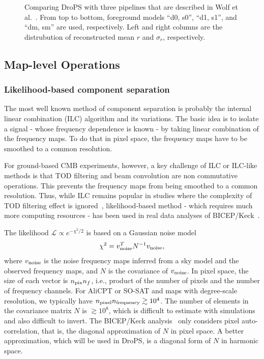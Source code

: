 \documentclass[12pt, a4paper]{ctexart} %
\begin{document}
\begin{figure}
  \caption{Comparing DroPS with three pipelines that are described in Wolf et al.~\cite{SO-SAT}. From top to bottom, foreground models ``d0, s0'', ``d1, s1'', and ``dm, sm'' are used, respectively. Left and right columns are the distrubution of reconstructed mean $r$ and $\sigma_r$, respectively.\label{fig:compare_SO}}
\end{figure}

\subsection{Map-level Operations}

\subsubsection{Likelihood-based component separation}
The most well known method of component separation is probably the internal linear combination (ILC) algorithm and its variations. The basic idea is to isolate a signal - whose frequency dependence is known - by taking linear combination of the frequency maps. To do that in pixel space, the frequency maps have to be smoothed to a common resolution. 

For ground-based CMB experiments, however, a key challenge of ILC or ILC-like methods is that TOD filtering and beam convolution are non commutative operations. This prevents the frequency maps from being smoothed to a common resolution. Thus, while ILC remains popular in studies where the complexity of TOD filtering effect is ignored~\cite{SO-SAT}, likelihood-based method - which requires much more computing resources - has been used in real data analyses of BICEP/Keck~\cite{BKmap}.


The likelihood $\mathcal{L}\propto e^{-\chi^2/2}$ is based on a Gaussian noise model
\begin{equation}
  \chi^2 = v_{\rm noise}^TN^{-1}v_{\rm noise},
\end{equation}
where $v_{\rm noise}$ is the noise frequency maps inferred from a sky model and the observed frequency maps, and $N$ is the covariance of $v_{\rm noise}$. In pixel space, the size of each vector is $n_{\rm pix} n_f$, i.e., product of the number of pixels and the number of frequency channels. For AliCPT or SO-SAT and maps with degree-scale resolution, we typically have $n_{\rm pixel} n_{\rm frequency} \gtrsim 10^4$. The number of elements in the covariance matrix $N$ is $\gtrsim 10^8$, which is difficult to estimate with simulations and also difficult to invert. The BICEP/Keck analysis~\cite{BKmap} only considers pixel auto-correlation, that is, the diagonal approximation of $N$ in pixel space. A better approximation, which will be used in DroPS, is a diagonal form of $N$ in harmonic space.
\end{document}
